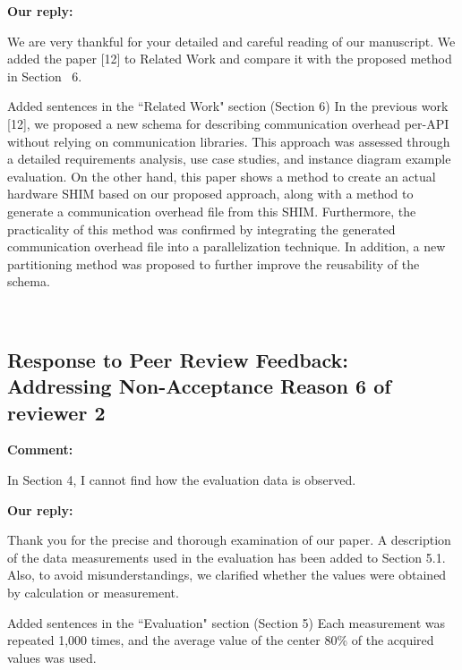\documentclass{article}
\begin{document}
\begin{flushleft}
  \textbf{Our reply:}
\end{flushleft}

\begin{adjustwidth}{1cm}{1cm}  %
    We are very thankful for your detailed and careful reading of our manuscript. We added the paper [12] to Related Work and compare it with the proposed method in Section ~6.
\end{adjustwidth}
\bigskip
\begin{itembox}[|]{Added sentences in the ``Related Work" section (Section 6)}
    In the previous work [12], we proposed a new schema for describing communication overhead per-API without relying on communication libraries. This approach was assessed through a detailed requirements analysis, use case studies, and instance diagram example evaluation. On the other hand, this paper shows a method to create an actual hardware SHIM based on our proposed approach, along with a method to generate a communication overhead file from this SHIM. Furthermore, the practicality of this method was confirmed by integrating the generated communication overhead file into a parallelization technique. In addition, a new partitioning method was proposed to further improve the reusability of the schema.
\end{itembox}\\


\newpage
\subsection{Response to Peer Review Feedback: Addressing Non-Acceptance Reason 6 of reviewer 2}
\begin{flushleft}
  \textbf{Comment:}
\end{flushleft}
\begin{adjustwidth}{1cm}{1cm}  %
   In Section 4, I cannot find how the evaluation data is observed.
\end{adjustwidth}
    
\begin{flushleft}
  \textbf{Our reply:}
\end{flushleft}
\begin{adjustwidth}{1cm}{1cm}  %
    Thank you for the precise and thorough examination of our paper. A description of the data measurements used in the evaluation has been added to Section 5.1.
    Also, to avoid misunderstandings, we clarified whether the values were obtained by calculation or measurement.
\end{adjustwidth}
\bigskip
\begin{itembox}[|]{Added sentences in the ``Evaluation" section (Section 5)}
    Each measurement was repeated 1,000 times, and the average value of the center 80\% of the acquired values was used.
\end{itembox}\\
\end{document}
